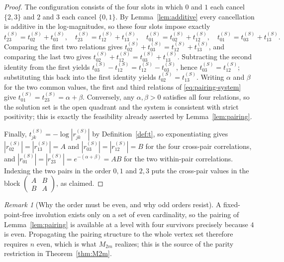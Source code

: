 \documentclass[11pt]{article}
\theoremstyle{plain}
\theoremstyle{definition}
\theoremstyle{remark}
\newtheorem{remark}[theorem]{Remark}
\begin{document}
\begin{aiblock}
\begin{proof}
The configuration consists of the four slots in which $0$ and $1$ each cancel $\{2,3\}$ and $2$ and $3$
each cancel $\{0,1\}$. By Lemma~\ref{lem:additive} every cancellation is additive in the
log-magnitudes, so these four slots impose exactly
\begin{equation}\label{eq:pairing-system}
  t^{(S)}_{23}=t^{(S)}_{02}+t^{(S)}_{03},\quad
  t^{(S)}_{23}=t^{(S)}_{12}+t^{(S)}_{13},\quad
  t^{(S)}_{01}=t^{(S)}_{02}+t^{(S)}_{12},\quad
  t^{(S)}_{01}=t^{(S)}_{03}+t^{(S)}_{13}.
\end{equation}
Comparing the first two relations gives $t^{(S)}_{02}+t^{(S)}_{03}=t^{(S)}_{12}+t^{(S)}_{13}$, and
comparing the last two gives $t^{(S)}_{02}+t^{(S)}_{12}=t^{(S)}_{03}+t^{(S)}_{13}$. Subtracting the
second identity from the first yields $t^{(S)}_{03}-t^{(S)}_{12}=t^{(S)}_{12}-t^{(S)}_{03}$, hence
$t^{(S)}_{03}=t^{(S)}_{12}$; substituting this back into the first identity yields
$t^{(S)}_{02}=t^{(S)}_{13}$. Writing $\alpha$ and $\beta$ for the two common values, the first and
third relations of \eqref{eq:pairing-system} give $t^{(S)}_{01}=t^{(S)}_{23}=\alpha+\beta$. Conversely,
any $\alpha,\beta>0$ satisfies all four relations, so the solution set is the open quadrant and the
system is consistent with strict positivity; this is exactly the feasibility already asserted by
Lemma~\ref{lem:pairing}.

Finally, $t^{(S)}_{jk}=-\log|r^{(S)}_{jk}|$ by Definition~\ref{def:t}, so exponentiating gives
$|r^{(S)}_{02}|=|r^{(S)}_{13}|=A$ and $|r^{(S)}_{03}|=|r^{(S)}_{12}|=B$ for the four cross-pair
correlations, and $|r^{(S)}_{01}|=|r^{(S)}_{23}|=e^{-(\alpha+\beta)}=AB$ for the two within-pair
correlations. Indexing the two pairs in the order $0,1$ and $2,3$ puts the cross-pair values in the
block $\begin{pmatrix}A&B\\B&A\end{pmatrix}$, as claimed.
\end{proof}

\begin{remark}[Why the order must be even, and why odd orders resist]\label{rem:even-needed}
A fixed-point-free involution exists only on a set of even cardinality, so the pairing of
Lemma~\ref{lem:pairing} is available at a level with four survivors precisely because $4$ is even.
Propagating the pairing structure to the whole vertex set therefore requires $n$ even, which is what
$M_{2m}$ realizes; this is the source of the parity restriction in Theorem~\ref{thm:M2m}.


\end{remark}
\end{aiblock}
\end{document}
